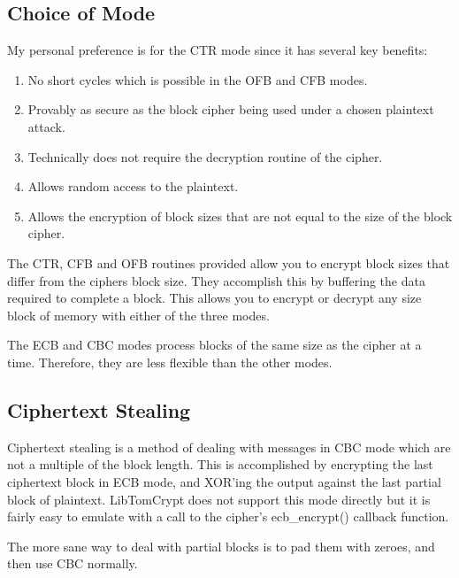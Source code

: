 \documentclass[synpaper]{book}
\begin{document}
\subsection{Choice of Mode}
My personal preference is for the CTR mode since it has several key benefits:
\begin{enumerate}
   \item No short cycles which is possible in the OFB and CFB modes.
   \item Provably as secure as the block cipher being used under a chosen plaintext attack.
   \item Technically does not require the decryption routine of the cipher.
   \item Allows random access to the plaintext.
   \item Allows the encryption of block sizes that are not equal to the size of the block cipher.
\end{enumerate}
The CTR, CFB and OFB routines provided allow you to encrypt block sizes that differ from the ciphers block size.  They
accomplish this by buffering the data required to complete a block.  This allows you to encrypt or decrypt any size
block of memory with either of the three modes.

The ECB and CBC modes process blocks of the same size as the cipher at a time.  Therefore, they are less flexible than the
other modes.

\subsection{Ciphertext Stealing}
Ciphertext stealing is a method of dealing with messages in CBC mode which are not a multiple of the block length.  This is accomplished
by encrypting the last ciphertext block in ECB mode, and XOR'ing the output against the last partial block of plaintext.  LibTomCrypt does not
support this mode directly but it is fairly easy to emulate with a call to the cipher's ecb\_encrypt() callback function.

The more sane way to deal with partial blocks is to pad them with zeroes, and then use CBC normally.
\end{document}
